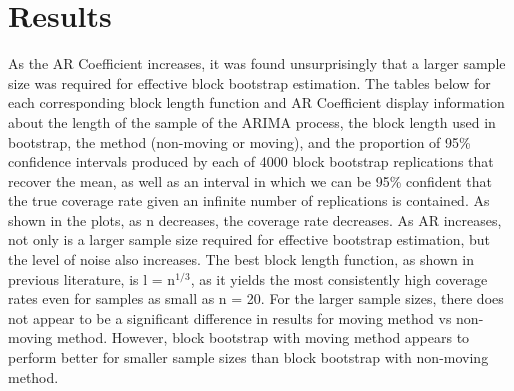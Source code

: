 \documentclass[12pt, letterpaper, titlepage]{article}
\begin{document}
 

\section{Results}
\label{sec:results}

As the AR Coefficient increases, it was found unsurprisingly that a larger sample size was 
required for effective block bootstrap estimation. The tables below for each corresponding block length function and AR Coefficient display information about the length of the sample of the ARIMA process, the block length used in bootstrap, the method (non-moving or moving), and the proportion of 95\% confidence intervals produced by each of 4000 block bootstrap replications that recover the mean, as well as an interval in which we can be 95\% confident that the true coverage rate given an infinite number of replications is contained. 
As shown in the plots, as n decreases, the coverage rate decreases. As AR increases, not only is a larger sample size required for effective bootstrap estimation, but the level of noise also increases. The best block length function, as shown in previous literature, is l = n$^{1/3}$, as it yields the most consistently high coverage rates even for samples as small as n = 20. For the larger sample sizes, there does not appear to be a significant difference in results for moving method vs non-moving method. However, block bootstrap with moving method appears to perform better for smaller sample sizes than block bootstrap with non-moving method.
\end{document}
